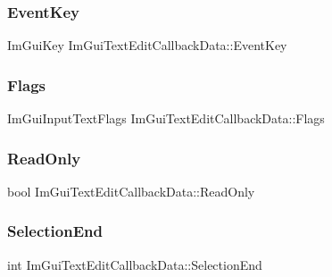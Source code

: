 \subsubsection{\texorpdfstring{Event\+Key}{EventKey}}
{\footnotesize\ttfamily Im\+Gui\+Key Im\+Gui\+Text\+Edit\+Callback\+Data\+::\+Event\+Key}

\hypertarget{struct_im_gui_text_edit_callback_data_a6ffea1ffba5aaa267937ea362b844e8c}{}\label{struct_im_gui_text_edit_callback_data_a6ffea1ffba5aaa267937ea362b844e8c} 
\subsubsection{\texorpdfstring{Flags}{Flags}}
{\footnotesize\ttfamily Im\+Gui\+Input\+Text\+Flags Im\+Gui\+Text\+Edit\+Callback\+Data\+::\+Flags}

\hypertarget{struct_im_gui_text_edit_callback_data_a37cec257a392910f386188978027541c}{}\label{struct_im_gui_text_edit_callback_data_a37cec257a392910f386188978027541c} 
\subsubsection{\texorpdfstring{Read\+Only}{ReadOnly}}
{\footnotesize\ttfamily bool Im\+Gui\+Text\+Edit\+Callback\+Data\+::\+Read\+Only}

\hypertarget{struct_im_gui_text_edit_callback_data_af3371b7f36bd6c2b528b033bdb1785a2}{}\label{struct_im_gui_text_edit_callback_data_af3371b7f36bd6c2b528b033bdb1785a2} 
\subsubsection{\texorpdfstring{Selection\+End}{SelectionEnd}}
{\footnotesize\ttfamily int Im\+Gui\+Text\+Edit\+Callback\+Data\+::\+Selection\+End}

\hypertarget{struct_im_gui_text_edit_callback_data_a1634bec3717f7e386033051cf604efed}{}\label{struct_im_gui_text_edit_callback_data_a1634bec3717f7e386033051cf604efed} 
